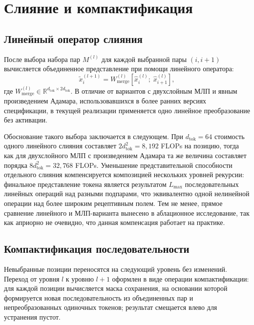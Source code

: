 \section{Слияние и компактификация}

\subsection{Линейный оператор слияния}

После выбора набора пар $M^{(l)}$ для каждой выбранной пары $(i, i+1)$
вычисляется объединенное представление при помощи линейного оператора:
\begin{equation}
  \tilde x_i^{(l+1)} = W_{\text{merge}}^{(l)} [\hat x_i^{(l)};\;
  \hat x_{i+1}^{(l)}],
  \label{eq:merge}
\end{equation}
где $W_{\text{merge}}^{(l)} \in \mathbb{R}^{d_{\text{tok}} \times 2
d_{\text{tok}}}$. В отличие от вариантов с двухслойным МЛП и явным
произведением Адамара, использовавшихся в более ранних версиях
спецификации, в текущей реализации применяется одно линейное
преобразование без активации.

Обоснование такого выбора заключается в следующем. При $d_{\text{tok}}
= 64$ стоимость одного линейного слияния составляет $2 d_{\text{tok}}^2
= 8{,}192$ FLOPs на позицию, тогда как для двухслойного МЛП с
произведением Адамара та же величина составляет порядка
$8 d_{\text{tok}}^2 = 32{,}768$ FLOPs. Уменьшение представительной
способности отдельного слияния компенсируется композицией нескольких
уровней рекурсии: финальное представление токена является результатом
$L_{\max}$ последовательных линейных операций над разными подпарами,
что эквивалентно одной нелинейной операции над более широким
рецептивным полем. Тем не менее, прямое сравнение линейного и
МЛП-варианта вынесено в аблационное исследование, так как априорно не
очевидно, что данная компенсация работает на практике.

\subsection{Компактификация последовательности}

Невыбранные позиции переносятся на следующий уровень без изменений.
Переход от уровня $l$ к уровню $l+1$ оформлен в виде операции
компактификации: для каждой позиции вычисляется маска сохранения, на
основании которой формируется новая последовательность из объединенных
пар и непреобразованных одиночных токенов; результат смещается влево
для устранения пустот.

